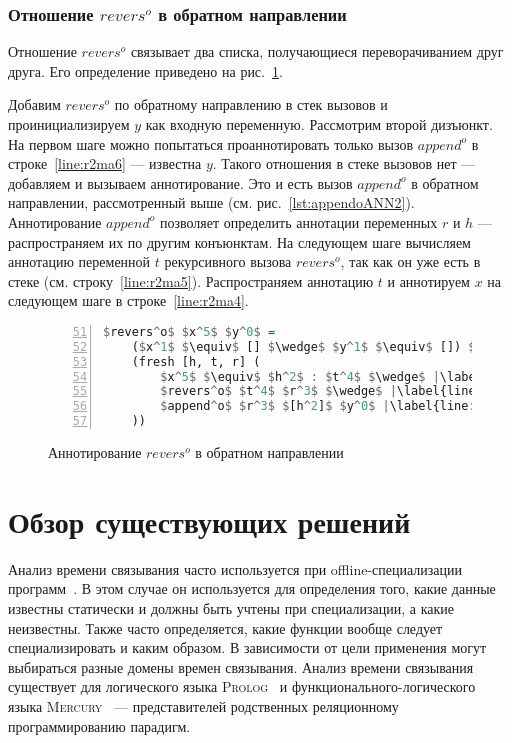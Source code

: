 \documentclass[conference,a4paper,american,russian]{IEEEtran}
\newcommand{\mercury}{\textsc{Mercury}}
\newcommand{\prolog}{\textsc{Prolog}}
\begin{document}
\subsubsection{Отношение $revers^o$ в обратном направлении}

Отношение $revers^o$ связывает два списка, получающиеся переворачиванием друг друга.
Его определение приведено на рис.~\ref{lst:reversoANN2}.

Добавим $revers^o$ по обратному направлению в стек вызовов и проинициализируем $y$ как входную переменную.
Рассмотрим второй дизъюнкт.
На первом шаге можно попытаться проаннотировать только вызов $append^o$ в строке~\ref{line:r2ma6} --- известна $y$.
Такого отношения в стеке вызовов нет --- добавляем и вызываем аннотирование.
Это и есть вызов $append^o$ в обратном направлении, рассмотренный выше (см. рис.~\ref{lst:appendoANN2}).
Аннотирование $append^o$ позволяет определить аннотации переменных $r$ и $h$ --- распространяем их по другим конъюнктам.
На следующем шаге вычисляем аннотацию переменной $t$ рекурсивного вызова $revers^o$, так как он уже есть в стеке (см. строку~\ref{line:r2ma5}).
Распространяем аннотацию $t$ и аннотируем $x$ на следующем шаге в строке~\ref{line:r2ma4}.

\begin{figure}[h!]
  \begin{center}
  \begin{minipage}{0.32\textwidth}
  \begin{lstlisting}[language=Haskell, frame=single, numbers=left,numberstyle=\small, firstnumber=51, escapechar=|]
  $revers^o$ $x^5$ $y^0$ =
    ($x^1$ $\equiv$ [] $\wedge$ $y^1$ $\equiv$ []) $\vee$ |\label{line:r2ma2}|
    (fresh [h, t, r] (
        $x^5$ $\equiv$ $h^2$ : $t^4$ $\wedge$ |\label{line:r2ma4}|
        $revers^o$ $t^4$ $r^3$ $\wedge$ |\label{line:r2ma5}|
        $append^o$ $r^3$ $[h^2]$ $y^0$ |\label{line:r2ma6}|
    ))
    \end{lstlisting}
  \end{minipage}
  \end{center}
  \caption{Аннотирование $revers^o$ в обратном направлении}
  \label{lst:reversoANN2}
\end{figure}

\section{Обзор существующих решений}\label{related}

Анализ времени связывания часто используется при offline-специализации программ~\cite{jones1993partial}.
В этом случае он используется для определения того, какие данные известны статически и должны быть учтены при специализации, а какие неизвестны.
Также часто определяется, какие функции вообще следует специализировать и каким образом.
В зависимости от цели применения могут выбираться разные домены времен связывания.
Анализ времени связывания существует для логического языка \prolog{}~\cite{leuschel2004prolog} и функционального-логического языка \mercury{}~\cite{vanhoof2004binding} --- представителей родственных реляционному программированию парадигм.
\end{document}

